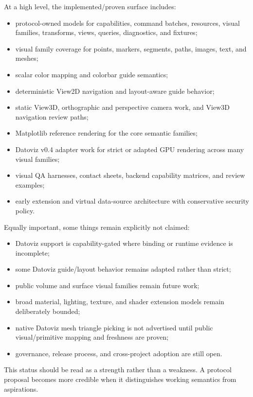 \documentclass[a4paper,11pt]{article}
\newcommand{\datoviz}{Datoviz\xspace}
\newcommand{\matplotlib}{Matplotlib\xspace}
\begin{document}
At a high level, the implemented/proven surface includes:

\begin{itemize}
  \item protocol-owned models for capabilities, command batches, resources, visual families,
  transforms, views, queries, diagnostics, and fixtures;
  \item visual family coverage for points, markers, segments, paths, images, text, and meshes;
  \item scalar color mapping and colorbar guide semantics;
  \item deterministic View2D navigation and layout-aware guide behavior;
  \item static View3D, orthographic and perspective camera work, and View3D navigation review paths;
  \item \matplotlib reference rendering for the core semantic families;
  \item \datoviz v0.4 adapter work for strict or adapted GPU rendering across many visual families;
  \item visual QA harnesses, contact sheets, backend capability matrices, and review examples;
  \item early extension and virtual data-source architecture with conservative security policy.
\end{itemize}

Equally important, some things remain explicitly not claimed:

\begin{itemize}
  \item \datoviz support is capability-gated where binding or runtime evidence is incomplete;
  \item some \datoviz guide/layout behavior remains adapted rather than strict;
  \item public volume and surface visual families remain future work;
  \item broad material, lighting, texture, and shader extension models remain deliberately bounded;
  \item native \datoviz mesh triangle picking is not advertised until public visual/primitive
  mapping and freshness are proven;
  \item governance, release process, and cross-project adoption are still open.
\end{itemize}

This status should be read as a strength rather than a weakness. A protocol proposal becomes more
credible when it distinguishes working semantics from aspirations.
\end{document}
